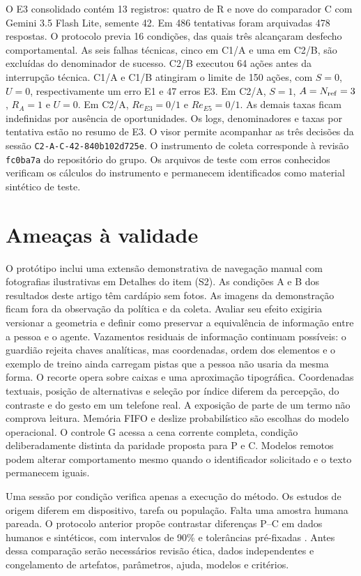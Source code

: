 O E3 consolidado contém 13 registros: quatro de R e nove do comparador C com Gemini 3.5 Flash Lite, semente 42. Em 486 tentativas foram arquivadas 478 respostas. O protocolo previa 16 condições, das quais três alcançaram desfecho comportamental. As seis falhas técnicas, cinco em C1/A e uma em C2/B, são excluídas do denominador de sucesso. C2/B executou 64 ações antes da interrupção técnica. C1/A e C1/B atingiram o limite de 150 ações, com $S=0$, $U=0$, respectivamente um erro E1 e 47 erros E3. Em C2/A, $S=1$, $A=N_{\rm ref}=3$, $R_A=1$ e $U=0$. Em C2/A, $Re_{E3}=0/1$ e $Re_{E5}=0/1$. As demais taxas ficam indefinidas por ausência de oportunidades. Os logs, denominadores e taxas por tentativa estão no resumo de E3. O visor permite acompanhar as três decisões da sessão \texttt{C2-A-C-42-840b102d725e}. O instrumento de coleta corresponde à revisão \texttt{fc0ba7a} do repositório do grupo. Os arquivos de teste com erros conhecidos verificam os cálculos do instrumento e permanecem identificados como material sintético de teste.

\section{Ameaças à validade}
O protótipo inclui uma extensão demonstrativa de navegação manual com fotografias ilustrativas em Detalhes do item (S2). As condições A e B dos resultados deste artigo têm cardápio sem fotos. As imagens da demonstração ficam fora da observação da política e da coleta. Avaliar seu efeito exigiria versionar a geometria e definir como preservar a equivalência de informação entre a pessoa e o agente.
Vazamentos residuais de informação continuam possíveis: o guardião rejeita chaves analíticas, mas coordenadas, ordem dos elementos e o exemplo de treino ainda carregam pistas que a pessoa não usaria da mesma forma. O recorte opera sobre caixas e uma aproximação tipográfica. Coordenadas textuais, posição de alternativas e seleção por índice diferem da percepção, do contraste e do gesto em um telefone real. A exposição de parte de um termo não comprova leitura. Memória FIFO e deslize probabilístico são escolhas do modelo operacional. O controle G acessa a cena corrente completa, condição deliberadamente distinta da paridade proposta para P e C. Modelos remotos podem alterar comportamento mesmo quando o identificador solicitado e o texto permanecem iguais.

Uma sessão por condição verifica apenas a execução do método. Os estudos de origem diferem em dispositivo, tarefa ou população. Falta uma amostra humana pareada. O protocolo anterior propõe contrastar diferenças P--C em dados humanos e sintéticos, com intervalos de 90\% e tolerâncias pré-fixadas \cite[p.~7]{hts}. Antes dessa comparação serão necessários revisão ética, dados independentes e congelamento de artefatos, parâmetros, ajuda, modelos e critérios.


